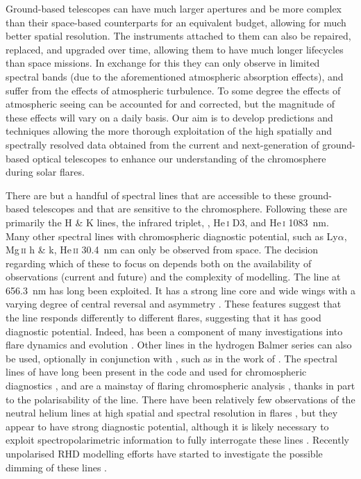 Ground-based telescopes can have much larger apertures and be more complex than their space-based counterparts for an equivalent budget, allowing for much better spatial resolution.
The instruments attached to them can also be repaired, replaced, and upgraded over time, allowing them to have much longer lifecycles than space missions.
In exchange for this they can only observe in limited spectral bands (due to the aforementioned atmospheric absorption effects), and suffer from the effects of atmospheric turbulence.
To some degree the effects of atmospheric seeing can be accounted for and corrected, but the magnitude of these effects will vary on a daily basis.
Our aim is to develop predictions and techniques allowing the more thorough exploitation of the high spatially and spectrally resolved data obtained from the current and next-generation of ground-based optical telescopes to enhance our understanding of the chromosphere during solar flares.

There are but a handful of spectral lines that are accessible to these ground-based telescopes and that are sensitive to the chromosphere.
Following \citet{DelaCruzRodriguez2017} these are primarily the \Caii{} H \& K lines, the \Caii{} infrared triplet, \Ha{}, He\,\textsc{i} D3, and He\,\textsc{i} \SI{1083}{\nano\metre}.
Many other spectral lines with chromospheric diagnostic potential, such as Ly$\alpha$, Mg\,\textsc{ii} h \& k, He\,\textsc{ii} \SI{30.4}{\nano\metre} can only be observed from space.
The decision regarding which of these to focus on depends both on the availability of observations (current and future) and the complexity of modelling.
The \Ha{} line at \SI{656.3}{\nano\m} has long been exploited.
It has a strong line core and wide wings with a varying degree of central reversal and asymmetry \citep[e.g.][]{Svestka1966}.
These features suggest that the line responds differently to different flares, suggesting that it has good diagnostic potential.
Indeed, \Ha{} has been a component of many investigations into flare dynamics and evolution \citep[e.g.][]{Acton1982,Heinzel1994,Wang1995,Kuridze2015,RubioDaCosta2016}.
Other lines in the hydrogen Balmer series can also be used, optionally in conjunction with \Ha{}, such as in the work of \citet{Capparelli2017}.
The spectral lines of \Caii{} have long been present in the \Radyn{} code and used for chromospheric diagnostics \citep[e.g.][]{Carlsson1992a}, and are a mainstay of flaring chromospheric analysis \citep[e.g.][]{1997Mein,Cauzzi2008,Kuridze2015,RubioDaCosta2016,Kuridze2018,Vissers2021,Yadav2021}, thanks in part to the polarisability of the \CaLine{} line.
There have been relatively few observations of the neutral helium lines at high spatial and spectral resolution in flares \citep[e.g.][]{Zeng2014, Libbrecht2019}, but they appear to have strong diagnostic potential, although it is likely necessary to exploit spectropolarimetric information to fully interrogate these lines \citep{Libbrecht2019}.
Recently unpolarised RHD modelling efforts have started to investigate the possible dimming of these lines \citep{Kerr2021}.

